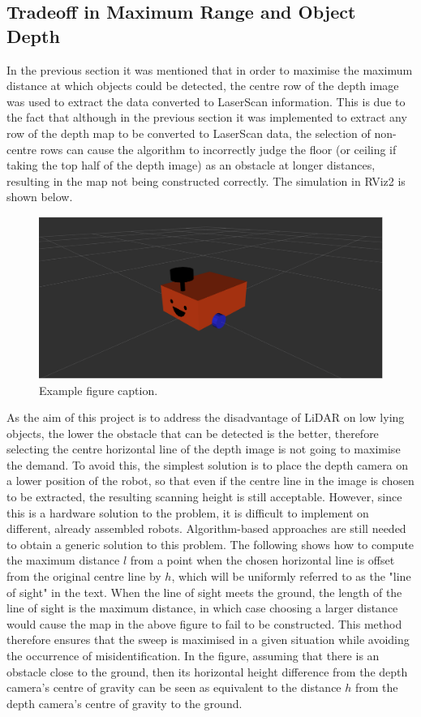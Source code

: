 \subsection{Tradeoff in Maximum Range and Object Depth}
In the previous section it was mentioned that in order to maximise the maximum distance at which objects could be detected, the centre row of the depth image was used to extract the data converted to LaserScan information. This is due to the fact that although in the previous section it was implemented to extract any row of the depth map to be converted to LaserScan data, the selection of non-centre rows can cause the algorithm to incorrectly judge the floor (or ceiling if taking the top half of the depth image) as an obstacle at longer distances, resulting in the map not being constructed correctly. The simulation in RViz2 is shown below.
\begin{figure}[H]
    \centering
    \includegraphics[width=0.8\linewidth]{figs/robot.png}
    \caption{Example figure caption.}
\end{figure}
As the aim of this project is to address the disadvantage of LiDAR on low lying objects, the lower the obstacle that can be detected is the better, therefore selecting the centre horizontal line of the depth image is not going to maximise the demand. To avoid this, the simplest solution is to place the depth camera on a lower position of the robot, so that even if the centre line in the image is chosen to be extracted, the resulting scanning height is still acceptable. However, since this is a hardware solution to the problem, it is difficult to implement on different, already assembled robots. Algorithm-based approaches are still needed to obtain a generic solution to this problem. The following shows how to compute the maximum distance $l$ from a point when the chosen horizontal line is offset from the original centre line by $h$, which will be uniformly referred to as the "line of sight" in the text. When the line of sight meets the ground, the length of the line of sight is the maximum distance, in which case choosing a larger distance would cause the map in the above figure to fail to be constructed. This method therefore ensures that the sweep is maximised in a given situation while avoiding the occurrence of misidentification. In the figure, assuming that there is an obstacle close to the ground, then its horizontal height difference from the depth camera's centre of gravity can be seen as equivalent to the distance $h$ from the depth camera's centre of gravity to the ground.
